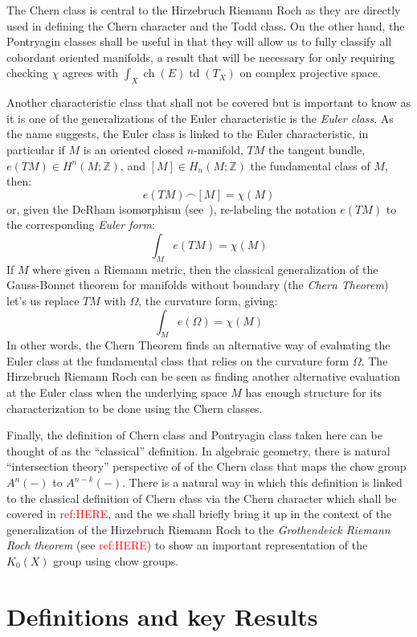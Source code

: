 \documentclass{book}
\newcommand{\Z}{{\mathbb{Z}}}
\newcommand{\ch}{{\operatorname{ch}}}
\newcommand{\td}{{\operatorname{td}}}
\begin{document}
The Chern class is central to the Hirzebruch Riemann Roch as they are directly used in defining the Chern
character and the Todd class. On the other hand, the Pontryagin classes shall be useful in that they will
allow us to fully classify all cobordant oriented manifolds, a result that will be necessary for only requiring checking
$\chi$ agrees with $\int_X \ch(E)\td(T_X)$ on complex projective space.

Another characteristic class that shall not be covered but is important to know as it is one of the
generalizations of the Euler characteristic is the \emph{Euler class}. As
the name suggests, the Euler class is linked to the Euler characteristic, in particular if $M$ is an oriented
closed $n$-manifold, $TM$ the tangent bundle, $e(TM) \in H^n(M; \Z)$, and $[M] \in H_n(M; \Z)$ the fundamental class of $M$, then:
\[
  e(TM) \frown [M] = \chi(M)
\]
or, given the DeRham isomorphism (see~\cite{NateDiffGeo}), re-labeling the notation $e(TM)$ to the corresponding \emph{Euler form}:
\[
  \int_M e(TM) = \chi(M)
\]
If $M$ where given a Riemann metric, then the classical generalization of the Gauss-Bonnet theorem for
manifolds without boundary (the \emph{Chern Theorem}) let's us replace $TM$ with $\Omega$, the curvature form,
giving:
\[
  \int_M e(\Omega) = \chi(M)
\]
In other words, the Chern Theorem finds an alternative way of evaluating the Euler class at the fundamental
class that relies on the curvature form $\Omega$. The Hirzebruch Riemann Roch can be seen as
finding another alternative evaluation at the Euler class when the underlying space $M$ has enough structure for
its characterization to be done using the Chern classes.

Finally, the definition of Chern class and Pontryagin class taken here can be thought of as the ``classical''
definition. In algebraic geometry, there is natural ``intersection theory'' perspective of of the Chern class
that maps the chow group $A^n(-)$ to $A^{n-k}(-)$. There is a natural way in which this definition is linked
to the classical definition of Chern class via the Chern character which shall be covered in
\textcolor{red}{ref:HERE}, and the we shall briefly bring it up in the context of the generalization of the
Hirzebruch Riemann Roch to the \emph{Grothendeick Riemann Roch theorem} (see \textcolor{red}{ref:HERE}) to
show an important representation of the $K_0(X)$ group using chow groups.


\section{Definitions and key Results}
\end{document}
